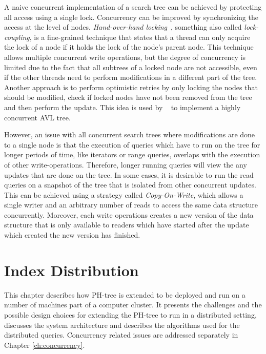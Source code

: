 \documentclass[11pt,a4paper]{globis-book}
\begin{document}
A naive concurrent implementation of a search tree can be achieved by protecting all access using a single lock. Concurrency can be improved by synchronizing the access at the level of nodes. \textit{Hand-over-hand locking}~\cite{shanir04}, something also called \textit{lock-coupling}, is a fine-grained technique that states that a thread can only acquire the lock of a node if it holds the lock of the node's parent node. This technique allows multiple concurrent write operations, but the degree of concurrency is limited due to the fact that all subtrees of a locked node are not accessible, even if the other threads need to perform modifications in a different part of the tree. Another approach is to perform optimistic retries by only locking the nodes that should be modified, check if locked nodes have not been removed from the tree and then perform the update. This idea is used by ~\cite{Bronson2010concurrent} to implement a highly concurrent AVL tree.

However, an issue with all concurrent search trees where modifications are done to a single node is that the execution of queries which have to run on the tree for longer periods of time, like iterators or range queries, overlaps with the execution of other write-operations. Therefore, longer running queries will view the any updates that are done on the tree. In some cases, it is desirable to run the read queries on a snapshot of the tree that is isolated from other concurrent updates. This can be achieved using a strategy called \textit{Copy-On-Write}, which allows a single writer and an arbitrary number of reads to access the same data structure concurrently. Moreover, each write operations creates a new version of the data structure that is only available to readers which have started after the update which created the new version has finished. 

\chapter{Index Distribution}
\label{ch:distindex}

This chapter describes how PH-tree is extended to be deployed and run on a number of machines part of a computer cluster. It presents the challenges and the possible design choices for extending the PH-tree to run in a distributed setting, discusses the system architecture and describes the algorithms used for the distributed queries. Concurrency related issues are addressed separately in Chapter \ref{ch:concurrency}.
\end{document}
